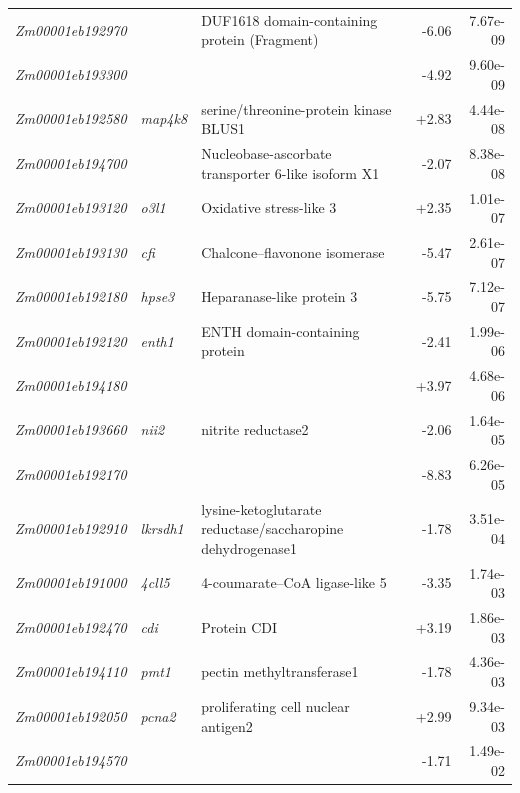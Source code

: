 \documentclass[9pt,twocolumn,twoside]{rilabRxiv}
\begin{document}
\begin{table}[!ht]
{\begin{tabular}{lllrr}
  \textit{Zm00001eb192970} &  & DUF1618 domain-containing protein (Fragment) & -6.06 & 7.67e-09 \\
  \textit{Zm00001eb193300} &  &  & -4.92 & 9.60e-09 \\
  \textit{Zm00001eb192580} & \textit{map4k8} & serine/threonine-protein kinase BLUS1 & +2.83 & 4.44e-08 \\
  \textit{Zm00001eb194700} &  & Nucleobase-ascorbate transporter 6-like isoform X1 & -2.07 & 8.38e-08 \\
  \textit{Zm00001eb193120} & \textit{o3l1} & Oxidative stress-like 3 & +2.35 & 1.01e-07 \\
  \textit{Zm00001eb193130} & \textit{cfi} & Chalcone--flavonone isomerase & -5.47 & 2.61e-07 \\
  \textit{Zm00001eb192180} & \textit{hpse3} & Heparanase-like protein 3 & -5.75 & 7.12e-07 \\
  \textit{Zm00001eb192120} & \textit{enth1} & ENTH domain-containing protein & -2.41 & 1.99e-06 \\
  \textit{Zm00001eb194180} &  &  & +3.97 & 4.68e-06 \\
  \textit{Zm00001eb193660} & \textit{nii2} & nitrite reductase2 & -2.06 & 1.64e-05 \\
  \textit{Zm00001eb192170} &  &  & -8.83 & 6.26e-05 \\
  \textit{Zm00001eb192910} & \textit{lkrsdh1} & lysine-ketoglutarate reductase/saccharopine dehydrogenase1 & -1.78 & 3.51e-04 \\
  \textit{Zm00001eb191000} & \textit{4cll5} & 4-coumarate--CoA ligase-like 5 & -3.35 & 1.74e-03 \\
  \textit{Zm00001eb192470} & \textit{cdi} & Protein CDI & +3.19 & 1.86e-03 \\
  \textit{Zm00001eb194110} & \textit{pmt1} & pectin methyltransferase1 & -1.78 & 4.36e-03 \\
  \textit{Zm00001eb192050} & \textit{pcna2} & proliferating cell nuclear antigen2 & +2.99 & 9.34e-03 \\
  \textit{Zm00001eb194570} &  &  & -1.71 & 1.49e-02 \\
\bottomrule
\end{tabular}}
\end{table}

\clearpage
\end{document}
